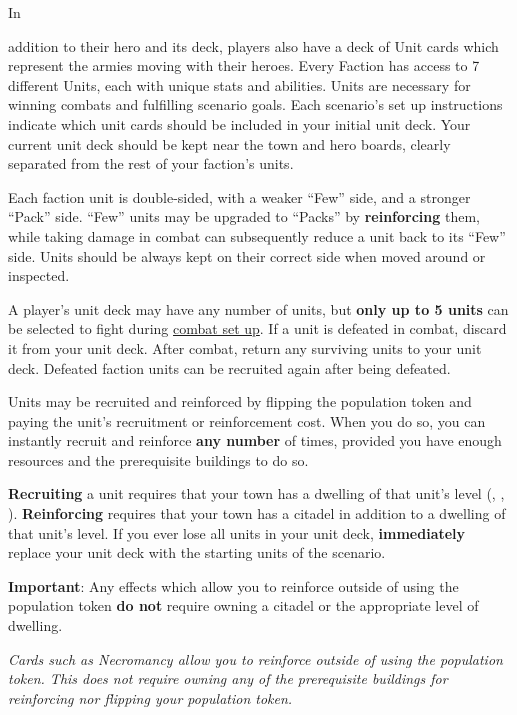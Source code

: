 \hypertarget{Units}{In} addition to their hero and its deck, players also have a deck of Unit cards which represent the armies moving with their heroes.
Every Faction has access to 7 different Units, each with unique stats and abilities.
Units are necessary for winning combats and fulfilling scenario goals.
Each scenario's set up instructions indicate which unit cards should be included in your initial unit deck.
Your current unit deck should be kept near the town and hero boards, clearly separated from the rest of your faction’s units.\par
Each faction unit is double-sided, with a weaker “Few” side, and a stronger “Pack” side.
“Few” units may be upgraded to “Packs” by \textbf{reinforcing} them, while taking damage in combat can subsequently reduce a unit back to its “Few” side.
Units should be always kept on their correct side when moved around or inspected.\par
A player’s unit deck may have any number of units, but \textbf{only up to 5 units} can be selected to fight during \hyperlink{Combatsetup}{combat set up}.
If a unit is defeated in combat, discard it from your unit deck.
After combat, return any surviving units to your unit deck.
Defeated faction units can be recruited again after being defeated.\par
Units may be recruited and reinforced by flipping the population token and paying the unit's recruitment  or reinforcement  cost.
When you do so, you can instantly recruit and reinforce \textbf{any number} of times, provided you have enough resources and the prerequisite buildings to do so.\par
\textbf{Recruiting} a unit requires that your town has a dwelling of that unit’s level (, ,  ).
\textbf{Reinforcing} requires that your town has a citadel in addition to a dwelling of that unit’s level.
If you ever lose all units in your unit deck, \textbf{immediately} replace your unit deck with the starting units of the scenario.\par

\textbf{Important}: Any effects which allow you to reinforce outside of using the population token \textbf{do not} require owning a citadel or the appropriate level of dwelling.
\begin{figure}[h]
\centering
{}
\end{figure}
\begin{center}
\small\textit{Cards such as Necromancy allow you to reinforce outside of using the population token.
This does not require owning any of the prerequisite buildings for reinforcing nor flipping your population token.}
\end{center}

